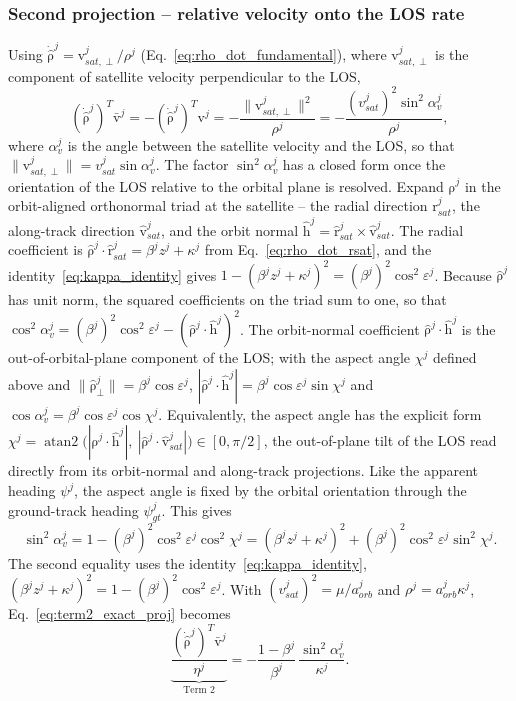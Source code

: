 \documentclass[letterpaper,times]{IONconf-v2}
\theoremstyle{plain}
\theoremstyle{remark}
\renewcommand{\vec}[1]{{\boldsymbol{\mathrm{#1}}}}
\begin{document}
\subsubsection{Second projection -- relative velocity onto the LOS rate} Using $\dot{\hat{\vec\rho}}^j = \vec v_{sat,\perp}^j/\rho^j$ (Eq.~\eqref{eq:rho_dot_fundamental}), where $\vec v_{sat,\perp}^j$ is the component of satellite velocity perpendicular to the LOS,
%
\begin{equation}\label{eq:term2_exact_proj}
(\dot{\hat{\vec\rho}}^j)^T\bar{\vec v}^j
= -(\dot{\hat{\vec\rho}}^j)^T\vec v^j
= -\frac{\|\vec v_{sat,\perp}^j\|^2}{\rho^j}
= -\frac{(v_{sat}^j)^2\sin^2\!\alpha_v^j}{\rho^j},
\end{equation}
%
where $\alpha_v^j$ is the angle between the satellite velocity and the LOS, so that $\|\vec v_{sat,\perp}^j\| = v_{sat}^j\sin\alpha_v^j$. The factor $\sin^2\!\alpha_v^j$ has a closed form once the orientation of the LOS relative to the orbital plane is resolved. Expand $\hat{\vec\rho}^j$ in the orbit-aligned orthonormal triad at the satellite -- the radial direction $\hat{\vec r}_{sat}^j$, the along-track direction $\hat{\vec v}_{sat}^j$, and the orbit normal $\hat{\vec h}^j = \hat{\vec r}_{sat}^j\times\hat{\vec v}_{sat}^j$. The radial coefficient is $\hat{\vec\rho}^j\cdot\hat{\vec r}_{sat}^j = \beta^j z^j+\kappa^j$ from Eq.~\eqref{eq:rho_dot_rsat}, and the identity~\eqref{eq:kappa_identity} gives $1-(\beta^j z^j+\kappa^j)^2 = (\beta^j)^2\cos^2\varepsilon^j$. Because $\hat{\vec\rho}^j$ has unit norm, the squared coefficients on the triad sum to one, so that $\cos^2\!\alpha_v^j = (\beta^j)^2\cos^2\varepsilon^j - (\hat{\vec\rho}^j\cdot\hat{\vec h}^j)^2$. The orbit-normal coefficient $\hat{\vec\rho}^j\cdot\hat{\vec h}^j$ is the out-of-orbital-plane component of the LOS; with the aspect angle $\chi^j$ defined above and $\|\hat{\vec\rho}_\perp^j\| = \beta^j\cos\varepsilon^j$, $|\hat{\vec\rho}^j\cdot\hat{\vec h}^j| = \beta^j\cos\varepsilon^j\sin\chi^j$ and $\cos\alpha_v^j = \beta^j\cos\varepsilon^j\cos\chi^j$. Equivalently, the aspect angle has the explicit form $\chi^j = \operatorname{atan2}\!\big(|\hat{\vec\rho}^j\cdot\hat{\vec h}^j|,\ |\hat{\vec\rho}^j\cdot\hat{\vec v}_{sat}^j|\big) \in [0,\pi/2]$, the out-of-plane tilt of the LOS read directly from its orbit-normal and along-track projections. Like the apparent heading $\psi^j$, the aspect angle is fixed by the orbital orientation through the ground-track heading $\psi_{gt}^j$. This gives
%
\begin{equation}\label{eq:sin2_alpha}
\sin^2\!\alpha_v^j = 1 - (\beta^j)^2\cos^2\varepsilon^j\cos^2\chi^j
= (\beta^j z^j + \kappa^j)^2 + (\beta^j)^2\cos^2\varepsilon^j\sin^2\chi^j .
\end{equation}
%
The second equality uses the identity~\eqref{eq:kappa_identity}, $(\beta^j z^j+\kappa^j)^2 = 1-(\beta^j)^2\cos^2\varepsilon^j$. With $(v_{sat}^j)^2 = \mu/a_{orb}^j$ and $\rho^j = a_{orb}^j\kappa^j$, Eq.~\eqref{eq:term2_exact_proj} becomes
%
\begin{equation}\label{eq:term2}
\underbrace{\frac{(\dot{\hat{\vec\rho}}^j)^T\bar{\vec v}^j}{\eta^j}}_{\text{Term 2}}
= -\frac{1-\beta^j}{\beta^j}\,\frac{\sin^2\!\alpha_v^j}{\kappa^j} .
\end{equation}
%
\end{document}
